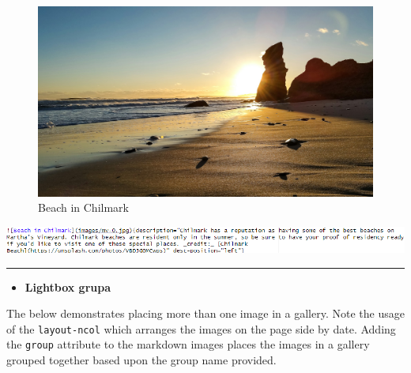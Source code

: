 \documentclass[
  a4paper,
  DIV=11,
  numbers=noendperiod,
  oneside,
  open=any]{scrreprt}
\providecommand{\tightlist}{%
  \setlength{\itemsep}{0pt}\setlength{\parskip}{0pt}}\usepackage{longtable,booktabs,array}
\begin{document}
\begin{figure}[H]

{\centering \includegraphics{images/mv-0.jpg}

}

\caption{Beach in Chilmark}

\end{figure}%

\includegraphics{images/_format_lightbox1.png}

\begin{center}\rule{0.5\linewidth}{0.5pt}\end{center}

\begin{itemize}
\tightlist
\item
  \textbf{Lightbox grupa}
\end{itemize}

The below demonstrates placing more than one image in a gallery. Note
the usage of the \texttt{layout-ncol} which arranges the images on the
page side by date. Adding the \texttt{group} attribute to the markdown
images places the images in a gallery grouped together based upon the
group name provided.
\end{document}
